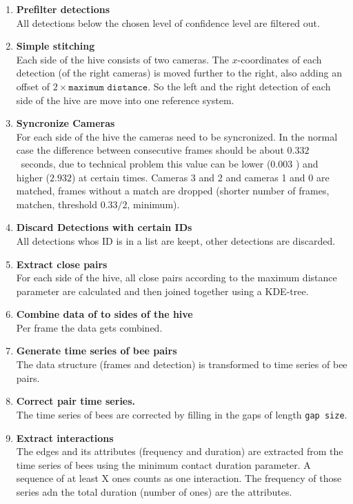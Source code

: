\begin{enumerate}
\item \textbf{Prefilter detections}\\
All detections below the chosen level of confidence level are filtered out.

\item \textbf{Simple stitching}\\
Each side of the hive consists of two cameras. 	The $x$-coordinates of each detection (of the right	cameras) is moved further to the right, also adding an offset of $2\times \texttt{maximum distance}$. So the left and the right detection of each side of the hive are move into one reference system.

\item \textbf{Syncronize Cameras}\\
For each side of the hive the cameras need to be syncronized. In the normal case the difference between consecutive frames should be about $0.332$~seconds, due to technical problem this value can be lower ($0.003$ ) and higher ($2.932$) at certain times. Cameras 3 and 2 and cameras 1 and 0 are matched, frames without a match are dropped (shorter number of frames, matchen, threshold $0.33/2$, minimum).

\item \textbf{Discard Detections with certain IDs}\\
All detections whos ID is in a list are keept, other detections are discarded.

\item \textbf{Extract close pairs}\\
For each side of the hive, all close pairs according to the maximum distance parameter are calculated and then joined together using a KDE-tree.

\item \textbf{Combine data of to sides of the hive}\\
Per frame the data gets combined.

\item \textbf{Generate time series of bee pairs}\\
The data structure (frames and detection) is transformed to time series of bee pairs.

\item \textbf{Correct pair time series.}\\
The time series of bees are corrected by filling in the gaps of length \texttt{gap size}.

\item \textbf{Extract interactions}\\
The edges and its attributes (frequency and duration) are extracted from the time series of bees using the minimum contact duration parameter. A sequence of at least X ones counts as one interaction. The frequency of those series adn the total duration (number of ones) are the attributes.

\end{enumerate}
